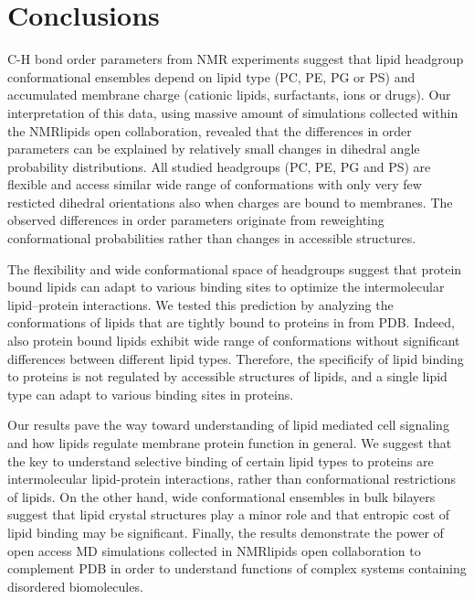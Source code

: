 \documentclass[aps,prl,superscriptaddress,twocolumn]{revtex4}
\begin{document}


\section{Conclusions}

C-H bond order parameters from NMR experiments %
suggest that lipid headgroup conformational ensembles depend on lipid type (PC, PE, PG or PS) 
and accumulated membrane charge (cationic lipids, surfactants, ions or drugs). 
Our interpretation of this data, using massive amount of simulations collected
within the NMRlipids open collaboration,
revealed that the differences in order parameters can be explained
by relatively small changes in dihedral angle probability distributions.
All studied headgroups (PC, PE, PG and PS) are flexible
and access similar wide range of conformations with only very few resticted dihedral orientations
also when charges are bound to membranes.
The observed differences in order parameters originate from
reweighting conformational probabilities rather than changes in accessible structures.

The flexibility and wide conformational space of headgroups suggest that protein bound lipids can
adapt to various binding sites to optimize the intermolecular lipid--protein interactions.
We tested this prediction by analyzing the conformations of lipids that are tightly bound to proteins in from PDB.
Indeed, also protein bound lipids exhibit wide range of conformations without significant 
differences between different lipid types. Therefore, the specificify of lipid binding to proteins is not
regulated by accessible structures of lipids, and a single lipid type can adapt to various binding sites in proteins.

Our results pave the way toward understanding of lipid mediated cell signaling and how lipids regulate membrane protein function in general.
We suggest that the key to understand selective binding of certain lipid types to proteins
are intermolecular lipid-protein interactions, rather than conformational restrictions of lipids.
On the other hand, wide conformational ensembles in bulk bilayers suggest that lipid crystal structures
play a minor role and that entropic cost of lipid binding may be significant.
Finally, the results demonstrate the power of open access MD simulations collected in NMRlipids open collaboration
to complement PDB in order to understand functions of complex systems containing disordered biomolecules.
\end{document}
